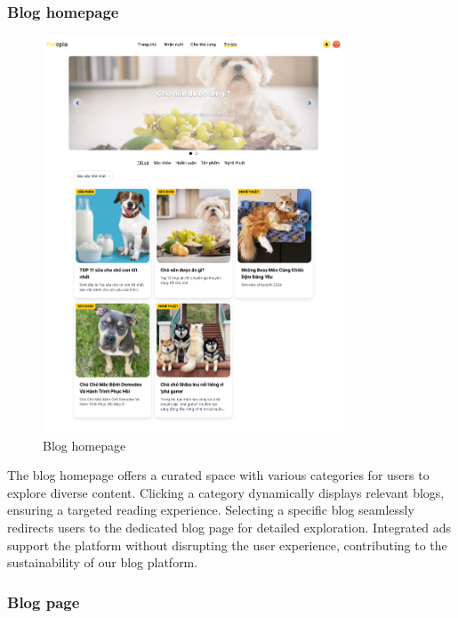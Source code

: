 \subsubsection{Blog homepage}
\begin{figure}[H]
    \centering
    \includegraphics[width=0.8\textwidth]{Figures/UI/blog_ui.png}
    \caption{Blog homepage}
\end{figure}

The blog homepage offers a curated space with various categories for users to explore diverse content.
 Clicking a category dynamically displays relevant blogs, ensuring a targeted reading experience. 
 Selecting a specific blog seamlessly redirects users to the dedicated blog page for detailed 
 exploration. Integrated ads support the platform without disrupting the user experience, 
 contributing to the sustainability of our blog platform.

\subsubsection{Blog page}

